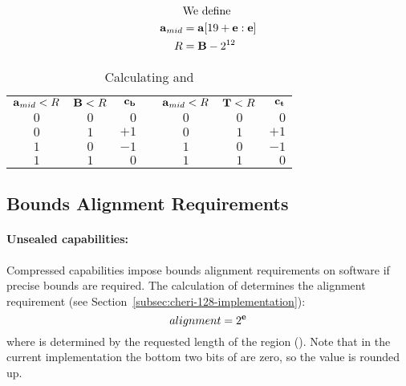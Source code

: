 \begin{table}[h!]
\begin{minipage}{.15\textwidth}
\begin{align*}
&\text{We define}\\
{\bf a}{}_{mid} &= {\bf a}{}[19+{\bf e}{}:{\bf e}{}]\\
R &= {\bf B}{} - 2^{12}
\end{align*}
\end{minipage}
\hspace{.05\textwidth}
\begin{minipage}{.70\textwidth}
\begin{tabular}{ccrp{2em}ccr}
\cmidrule[\heavyrulewidth]{1-3}\cmidrule[\heavyrulewidth]{5-7}
${\bf a}{}_{mid}<R$ & ${\bf B}{}<R$ & $\textbf{c\textsubscript{b}}{}$&&${\bf a}{}_{mid}<R$ & ${\bf T}{}<R$ & $\textbf{c\textsubscript{t}}{}$\\
\cmidrule{1-3}\cmidrule{5-7}
$0$ & $0$ & $0$  &&$0$ & $0$ & $0$\\
$0$ & $1$ & $+1$ &&$0$ & $1$ & $+1$\\
$1$ & $0$ & $-1$ &&$1$ & $0$ & $-1$\\
$1$ & $1$ & $0$  &&$1$ & $1$ & $0$\\
\cmidrule[\heavyrulewidth]{1-3}\cmidrule[\heavyrulewidth]{5-7}
\end{tabular}
\end{minipage}
\caption{Calculating \cbasecorrection{} and \ctopcorrection{}}
\label{table:address-correction}
\end{table}

\subsection{Bounds Alignment Requirements}
\label{sec:cheri-128-alignment}


\paragraph{Unsealed capabilities:} Compressed capabilities impose bounds alignment requirements on software if
precise bounds are required.  The calculation of \cexponent{} determines
the alignment requirement (see
Section~\ref{subsec:cheri-128-implementation}):
\[alignment = 2^{\bf e}{}\]
where \cexponent{} is determined by the requested length of the region
(\rlength{}).  Note
that in the current implementation the bottom two bits of \cexponent{}
are zero, so the value is rounded up.

